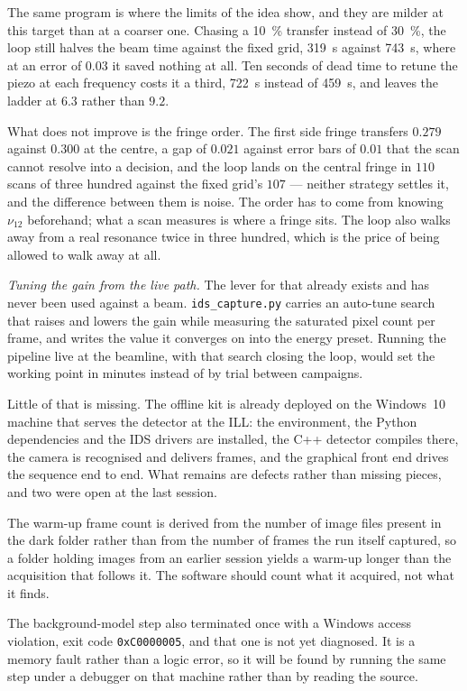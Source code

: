 \documentclass[a4paper,headsepline,oneside,11pt]{scrartcl}
\begin{document}
The same program is where the limits of the idea show, and they are milder at
this target than at a coarser one. Chasing a \SI{10}{\percent} transfer instead
of \SI{30}{\percent}, the loop still halves the beam time against the fixed
grid, \SI{319}{\second} against \SI{743}{\second}, where at an error of $0.03$
it saved nothing at all. Ten seconds of dead time to retune the piezo at each
frequency costs it a third, \SI{722}{\second} instead of \SI{459}{\second}, and
leaves the ladder at $6.3$ rather than $9.2$.

What does not improve is the fringe order. The first side fringe transfers
$0.279$ against $0.300$ at the centre, a gap of $0.021$ against error bars of
$0.01$ that the scan cannot resolve into a decision, and the loop lands on the
central fringe in $110$ scans of three hundred against the fixed grid's $107$
--- neither strategy settles it, and the difference between them is noise. The
order has to come from knowing $\nu_{12}$ beforehand; what a scan measures is
where a fringe sits. The loop also walks away from a real resonance twice in
three hundred, which is the price of being allowed to walk away at all.

\emph{Tuning the gain from the live path.} The lever for that already exists and
has never been used against a beam. \texttt{ids\_capture.py} carries an
auto-tune search that raises and lowers the gain while measuring the saturated
pixel count per frame, and writes the value it converges on into the energy
preset. Running the pipeline live at the beamline, with that search closing the
loop, would set the working point in minutes instead of by trial between
campaigns.

Little of that is missing. The offline kit is already deployed on the
Windows~10 machine that serves the detector at the ILL: the environment, the
Python dependencies and the IDS drivers are installed, the C++ detector compiles
there, the camera is recognised and delivers frames, and the graphical front end
drives the sequence end to end. What remains are defects rather than missing
pieces, and two were open at the last session.

The warm-up frame count is derived from the number of image files present in the
dark folder rather than from the number of frames the run itself captured, so a
folder holding images from an earlier session yields a warm-up longer than the
acquisition that follows it. The software should count what it acquired, not what
it finds.

The background-model step also terminated once with a Windows access violation,
exit code \texttt{0xC0000005}, and that one is not yet diagnosed. It is a memory
fault rather than a logic error, so it will be found by running the same step
under a debugger on that machine rather than by reading the source.
\end{document}
